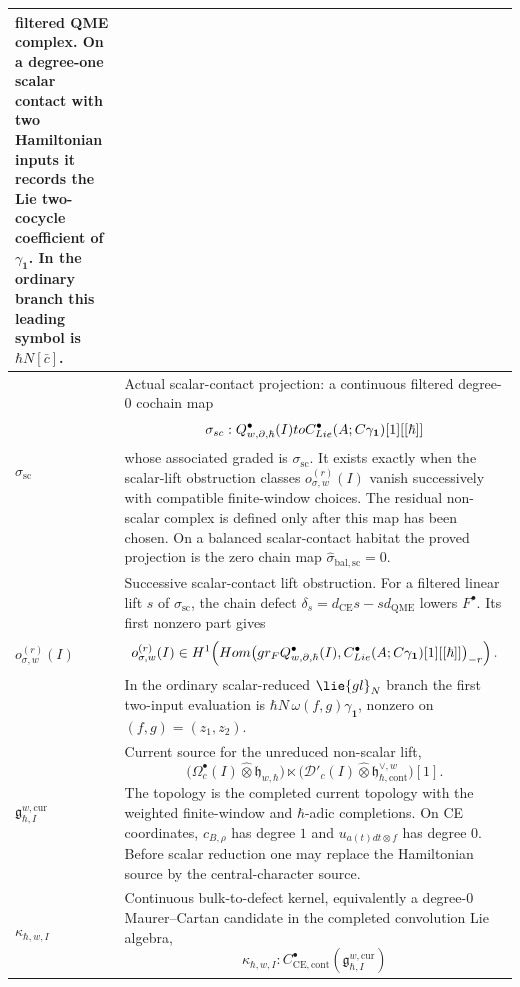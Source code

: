 \begin{longtable}{@{}>{\raggedright\arraybackslash}p{}
  >{\raggedright\arraybackslash}p{}@{}}
filtered QME complex.  On a degree-one scalar contact with two
Hamiltonian inputs it records the Lie two-cocycle coefficient of
\(\gamma_{\mathbf 1}\).  In the ordinary branch this leading symbol is
\(\hbar N[\bar c]\).\\
\hline
\(\widehat\sigma_{\mathrm{sc}}\) &
Actual scalar-contact projection: a continuous filtered degree-\(0\)
cochain map
\[
  \sigma_{sc}:
  Q^\bullet_{w,\partial,\hbar}(I)
  to
  C^\bullet_{Lie}(A;C\gamma_{\mathbf 1})[1][[\hbar]]
\]
whose associated graded is \(\sigma_{\mathrm{sc}}\).  It exists exactly
when the scalar-lift obstruction classes
\(o_{\sigma,w}^{(r)}(I)\) vanish successively with compatible
finite-window choices.  The residual non-scalar complex is defined only
after this map has been chosen.  On a balanced scalar-contact habitat the
proved projection is the zero chain map
\(\widehat\sigma_{\mathrm{bal,sc}}=0\).\\
\hline
\(o_{\sigma,w}^{(r)}(I)\) &
Successive scalar-contact lift obstruction.  For a filtered linear lift
\(s\) of \(\sigma_{\mathrm{sc}}\), the chain defect
\(\delta_s=d_{\mathrm{CE}}s-sd_{\mathrm{QME}}\) lowers \(F^\bullet\).
Its first nonzero part gives
\[
  o_{\sigma,w}^{(r)}(I)\in
  H^1\!\left(
    Hom\bigl(
      gr_FQ^\bullet_{w,\partial,\hbar}(I),
      C^\bullet_{Lie}(A;C\gamma_{\mathbf 1})[1][[\hbar]]
    \bigr)_{-r}
  \right).
\]
In the ordinary scalar-reduced \(\lie{gl}_N\) branch the first
two-input evaluation is
\(\hbar N\,\omega(f,g)\gamma_{\mathbf 1}\), nonzero on
\((f,g)=(z_1,z_2)\).\\
\hline
\(\mathfrak g^{w,\mathrm{cur}}_{\hbar,I}\) &
Current source for the unreduced non-scalar lift,
\[
  \bigl(\Omega^\bullet_c(I)\widehat\otimes\mathfrak h_{w,\hbar}\bigr)
  \ltimes
  \bigl(\mathcal D'_c(I)\widehat\otimes
  \mathfrak h^{\vee,w}_{\hbar,\mathrm{cont}}\bigr)[1].
\]
The topology is the completed current topology with the weighted
finite-window and \(\hbar\)-adic completions.  On CE coordinates,
\(c_{B,\rho}\) has degree \(1\) and
\(u_{a(t)dt\otimes f}\) has degree \(0\).  Before scalar reduction one
may replace the Hamiltonian source by the central-character source.\\
\hline
\(\kappa_{\hbar,w,I}\) &
Continuous bulk-to-defect kernel, equivalently a degree-\(0\)
Maurer--Cartan candidate in the completed convolution Lie algebra,
\[
  \kappa_{\hbar,w,I}\colon
  C^\bullet_{\mathrm{CE},\mathrm{cont}}
  (\mathfrak g^{w,\mathrm{cur}}_{\hbar,I})
\]
\end{longtable}
